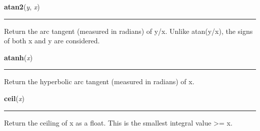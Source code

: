     \vspace{0.5ex}

\hspace{.8\funcindent}\begin{boxedminipage}{\funcwidth}

    \raggedright \textbf{atan2}(\textit{y}, \textit{x})

    \vspace{-1.5ex}

    \rule{\textwidth}{0.5\fboxrule}
\setlength{\parskip}{2ex}
    Return the arc tangent (measured in radians) of y/x. Unlike atan(y/x), 
    the signs of both x and y are considered.

\setlength{\parskip}{1ex}
    \end{boxedminipage}

    \label{math:atanh}

    \vspace{0.5ex}

\hspace{.8\funcindent}\begin{boxedminipage}{\funcwidth}

    \raggedright \textbf{atanh}(\textit{x})

    \vspace{-1.5ex}

    \rule{\textwidth}{0.5\fboxrule}
\setlength{\parskip}{2ex}
    Return the hyperbolic arc tangent (measured in radians) of x.

\setlength{\parskip}{1ex}
    \end{boxedminipage}

    \label{math:ceil}

    \vspace{0.5ex}

\hspace{.8\funcindent}\begin{boxedminipage}{\funcwidth}

    \raggedright \textbf{ceil}(\textit{x})

    \vspace{-1.5ex}

    \rule{\textwidth}{0.5\fboxrule}
\setlength{\parskip}{2ex}
    Return the ceiling of x as a float. This is the smallest integral value
    {\textgreater}= x.

\setlength{\parskip}{1ex}
    \end{boxedminipage}

